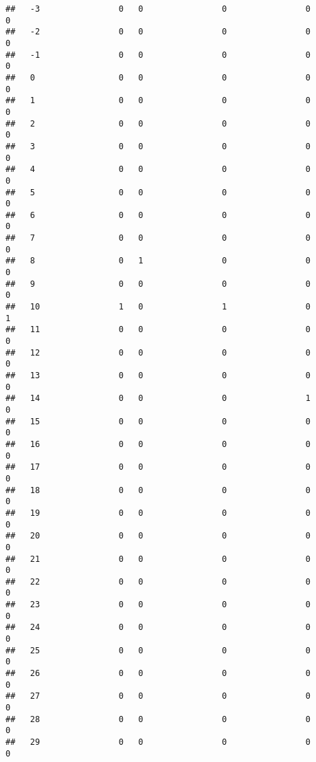\documentclass[]{article}
\begin{document}
\begin{verbatim}
##   -3                0   0                0                0                0
##   -2                0   0                0                0                0
##   -1                0   0                0                0                0
##   0                 0   0                0                0                0
##   1                 0   0                0                0                0
##   2                 0   0                0                0                0
##   3                 0   0                0                0                0
##   4                 0   0                0                0                0
##   5                 0   0                0                0                0
##   6                 0   0                0                0                0
##   7                 0   0                0                0                0
##   8                 0   1                0                0                0
##   9                 0   0                0                0                0
##   10                1   0                1                0                1
##   11                0   0                0                0                0
##   12                0   0                0                0                0
##   13                0   0                0                0                0
##   14                0   0                0                1                0
##   15                0   0                0                0                0
##   16                0   0                0                0                0
##   17                0   0                0                0                0
##   18                0   0                0                0                0
##   19                0   0                0                0                0
##   20                0   0                0                0                0
##   21                0   0                0                0                0
##   22                0   0                0                0                0
##   23                0   0                0                0                0
##   24                0   0                0                0                0
##   25                0   0                0                0                0
##   26                0   0                0                0                0
##   27                0   0                0                0                0
##   28                0   0                0                0                0
##   29                0   0                0                0                0

\end{verbatim}
\end{document}
